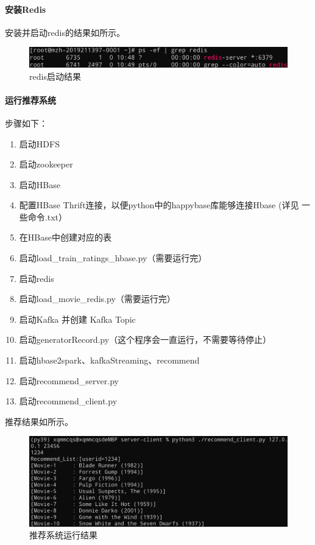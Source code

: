 \documentclass[lang=cn,11pt,a4paper,cite=authornum]{paper}
\begin{document}
\paragraph{安装Redis}

安装并启动redis的结果如所示。

\begin{figure}[!htb]
    \centering
    \includegraphics[width=\textwidth]{./images/2.jpg}
    \caption{redis启动结果\label{fig:2}}
\end{figure}

\paragraph{运行推荐系统}

步骤如下：

\begin{enumerate}
    \item 启动HDFS
    \item 启动zookeeper
    \item 启动HBase
    \item 配置HBase Thrift连接，以便python中的happybase库能够连接Hbase (详见 一些命令.txt）
    \item 在HBase中创建对应的表
    \item 启动load\_train\_ratings\_hbase.py（需要运行完）
    \item 启动redis
    \item 启动load\_movie\_redis.py（需要运行完）
    \item 启动Kafka 并创建 Kafka Topic
    \item 启动generatorRecord.py（这个程序会一直运行，不需要等待停止）
    \item 启动hbase2spark、kafkaStreaming、recommend
    \item 启动recommend\_server.py
    \item 启动recommend\_client.py
\end{enumerate}

推荐结果如所示。

\begin{figure}[!htb]
    \centering
    \includegraphics[width=\textwidth]{./images/3.jpg}
    \caption{推荐系统运行结果\label{fig:3}}
\end{figure}
\end{document}
